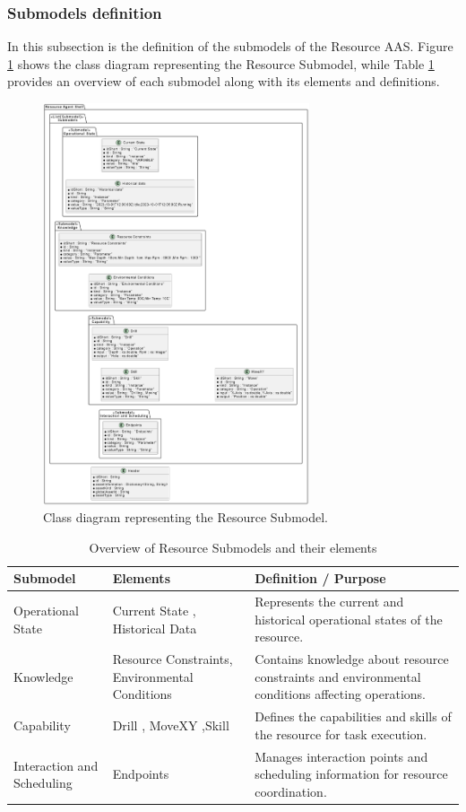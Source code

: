 \subsubsection{Submodels definition}
In this subsection is the definition of the submodels of the Resource AAS.
Figure \ref{fig:submodel_classes} shows the class diagram representing the Resource Submodel, while Table \ref{tab:submodels_overview} provides an overview of each submodel along with its elements and definitions.
\begin{figure}[ht]
    \centering
    \includegraphics[width=0.7\textwidth]{Images/Classes_Resource/Submodels/Submodels.png}
    \caption{Class diagram representing the Resource Submodel.}
    \label{fig:submodel_classes}
\end{figure}
\begin{table}[ht]
  \centering
  \caption{Overview of Resource Submodels and their elements}
  \label{tab:submodels_overview}
  \begin{tabularx}{\textwidth}{|l|X|X|}
    \hline
    \textbf{Submodel} & \textbf{Elements} & \textbf{Definition / Purpose} \\
    \hline
    Operational State & Current State , Historical Data & Represents the current and historical operational states of the resource. \\
    \hline
    Knowledge & Resource Constraints, Environmental Conditions & Contains knowledge about resource constraints and environmental conditions affecting operations. \\
    \hline
    Capability & Drill , MoveXY ,Skill & Defines the capabilities and skills of the resource for task execution. \\
    \hline
    Interaction and Scheduling & Endpoints & Manages interaction points and scheduling information for resource coordination. \\
    \hline
  \end{tabularx}
\end{table}


